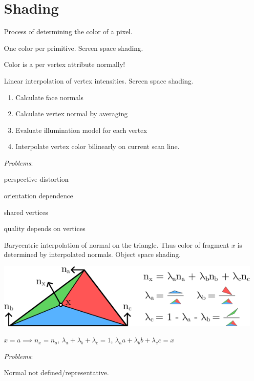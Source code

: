 \section{Shading}

\begin{definition}[Shading]
  Process of determining the color of a pixel.
\end{definition}

\begin{definition}
  One color per primitive. Screen space shading.
\end{definition}

\begin{theorem}
  Color is a per vertex attribute normally!
\end{theorem}

\begin{algorithm}
  Linear interpolation of vertex intensities. Screen space shading.
  \begin{enumerate}
    \item Calculate face normals
    \item Calculate vertex normal by averaging
    \item Evaluate illumination model for each vertex
    \item Interpolate vertex color bilinearly on current scan line.
  \end{enumerate}

  \textit{Problems}:
  \begin{itemize*}
    \item perspective distortion
    \item orientation dependence
    \item shared vertices
    \item quality depends on vertices
  \end{itemize*}
\end{algorithm}


\begin{algorithm}
  Barycentric interpolation of normal on the triangle. Thus color of fragment \(x\) is determined by interpolated normals.
  Object space shading.

  \includegraphics*[width=\linewidth]{assets/phong-shading.png}

  \(x = a \implies n_x = n_a\), \(\lambda_a + \lambda_b + \lambda_c = 1\), \(\lambda_a a + \lambda_b b + \lambda_c c = x\)

  \textit{Problems}:
  \begin{itemize*}
    \item Normal not defined/representative.
  \end{itemize*}
\end{algorithm}


